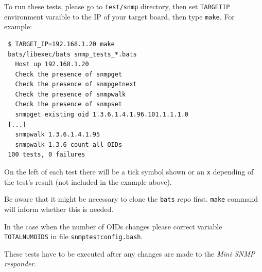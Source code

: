 \documentclass[a4paper, 12pt]{article}
\renewcommand{\_}{\underscore\allowbreak}
\begin{document}
To run these tests, please go to \texttt{test/snmp} directory, then set
\texttt{TARGET\_IP} environment varaible to the IP of your target board, then type
\texttt{make}. For example:
\begin{lstlisting}
 $ TARGET_IP=192.168.1.20 make
 bats/libexec/bats snmp_tests_*.bats
   Host up 192.168.1.20
   Check the presence of snmpget
   Check the presence of snmpgetnext
   Check the presence of snmpwalk
   Check the presence of snmpset
   snmpget existing oid 1.3.6.1.4.1.96.101.1.1.1.0
 [...]
   snmpwalk 1.3.6.1.4.1.95
   snmpwalk 1.3.6 count all OIDs
 100 tests, 0 failures
\end{lstlisting}
On the left of each test there will be a tick symbol shown or an \texttt{x}
depending of the test's result (not included in the example above).

Be aware that it might be necessary to clone the \texttt{bats} repo first.
\texttt{make} command will inform whether this is needed.

In the case when the number of OIDs changes please correct variable \texttt{TOTAL\_NUM\_OIDS}
in file \texttt{snmp\_test\_config.bash}.

These tests have to be executed after any changes are made to the \textit{Mini SNMP
responder}.
\end{document}
